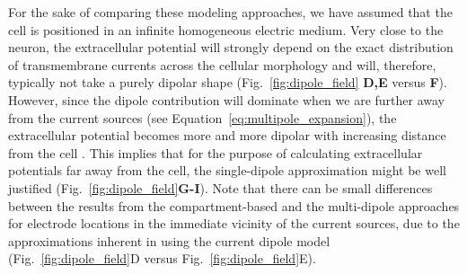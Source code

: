 \documentclass[preprint,10pt,authoryear]{elsarticle}
\begin{document}
For the sake of comparing these modeling approaches, we have assumed that the cell is positioned in an infinite homogeneous electric medium. Very close to the neuron, the extracellular potential will strongly depend on the exact distribution of transmembrane currents across the cellular morphology and  will, therefore, typically not take a purely dipolar shape (Fig.~\ref{fig:dipole_field} \textbf{D,E} versus \textbf{F}). However, since the dipole contribution will dominate when we are further away from the current sources (see Equation~\ref{eq:multipole_expansion}), the extracellular potential becomes more and more dipolar with increasing distance from the cell \citep{LINDEN2010}. This implies that for the purpose of calculating extracellular potentials far away from the cell, the single-dipole approximation might be well justified (Fig.~\ref{fig:dipole_field}\textbf{G-I}). Note that there can be small differences between the results from the compartment-based and the multi-dipole approaches for electrode locations in the immediate vicinity of the current sources, due to the approximations inherent in using the current dipole model (Fig.~\ref{fig:dipole_field}D versus Fig.~\ref{fig:dipole_field}E).
\end{document}
